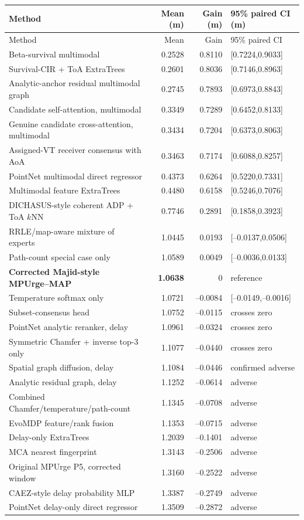 \documentclass[10pt,a4paper]{article}
\begin{document}
\begin{longtable}{@{}p{.48\linewidth}rrp{.24\linewidth}@{}}
\toprule Method & Mean (m)&Gain (m)&95\% paired CI (m)\\\midrule
\endfirsthead\toprule Method&Mean&Gain&95\% paired CI\\\midrule\endhead
\rowcolor{green!9}Beta-survival multimodal&0.2528&0.8110&[0.7224,0.9033]\\
\rowcolor{green!9}Survival-CIR + ToA ExtraTrees&0.2601&0.8036&[0.7146,0.8963]\\
\rowcolor{green!9}Analytic-anchor residual multimodal graph&0.2745&0.7893&[0.6973,0.8843]\\
Candidate self-attention, multimodal&0.3349&0.7289&[0.6452,0.8133]\\
Genuine candidate cross-attention, multimodal&0.3434&0.7204&[0.6373,0.8063]\\
Assigned-VT receiver consensus with AoA&0.3463&0.7174&[0.6088,0.8257]\\
PointNet multimodal direct regressor&0.4373&0.6264&[0.5220,0.7331]\\
Multimodal feature ExtraTrees&0.4480&0.6158&[0.5246,0.7076]\\
DICHASUS-style coherent ADP + ToA $k$NN&0.7746&0.2891&[0.1858,0.3923]\\
RRLE/map-aware mixture of experts&1.0445&0.0193&[--0.0137,0.0506]\\
Path-count special case only&1.0589&0.0049&[--0.0036,0.0133]\\
\rowcolor{blue!8}\textbf{Corrected Majid-style MPUrge--MAP}&\textbf{1.0638}&0&reference\\
Temperature softmax only&1.0721&--0.0084&[--0.0149,--0.0016]\\
Subset-consensus head&1.0752&--0.0115&crosses zero\\
PointNet analytic reranker, delay&1.0961&--0.0324&crosses zero\\
Symmetric Chamfer + inverse top-3 only&1.1077&--0.0440&crosses zero\\
Spatial graph diffusion, delay&1.1084&--0.0446&confirmed adverse\\
Analytic residual graph, delay&1.1252&--0.0614&adverse\\
Combined Chamfer/temperature/path-count&1.1345&--0.0708&adverse\\
EvoMDP feature/rank fusion&1.1353&--0.0715&adverse\\
Delay-only ExtraTrees&1.2039&--0.1401&adverse\\
MCA nearest fingerprint&1.3143&--0.2506&adverse\\
Original MPUrge P5, corrected window&1.3160&--0.2522&adverse\\
CAEZ-style delay probability MLP&1.3387&--0.2749&adverse\\
PointNet delay-only direct regressor&1.3509&--0.2872&adverse\\\bottomrule
\end{longtable}
\end{document}
